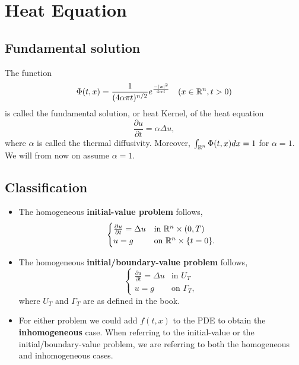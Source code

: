 \documentclass[oneside,a4paper,11pt]{report}
\begin{document}
\section{Heat Equation}

\subsection{Fundamental solution}
The function
\[ \Phi(t,x) = \frac{1}{(4\alpha \pi t)^{n/2}} e^{\frac{-|x|^2}{4\alpha t}} \quad (x \in {\mathbb{R}^n}, t > 0) \]
is called the fundamental solution, or heat Kernel, of the heat equation
\[ \frac{\partial u}{\partial t} = \alpha \Delta u, \]
where $\alpha$ is called the thermal diffusivity. Moreover, $\int_{{\mathbb{R}^n}} \Phi(t,x) dx = 1 $ for $\alpha=1$. We will from now on assume $\alpha = 1$.

\subsection{Classification}
\begin{itemize}

\item The homogeneous \textbf{initial-value problem} follows,
\[\begin{cases}
\frac{\partial u}{\partial t} = \Delta u & \text{in } {\mathbb{R}^n} \times (0,T)\\
u = g & \text{on } {\mathbb{R}^n} \times \{t=0\}.
\end{cases} \]

\item The homogeneous \textbf{initial/boundary-value problem} follows,
\[\begin{cases}
\frac{\partial u}{\partial t} = \Delta u & \text{in } U_T\\
u = g & \text{on } \Gamma_T,
\end{cases} \]
where $U_T$ and $\Gamma_T$ are as defined in the book.

\item For either problem we could add $f(t,x)$ to the PDE to obtain the \textbf{inhomogeneous} case. When referring to the initial-value or the initial/boundary-value problem, we are referring to both the homogeneous and inhomogeneous cases.
\end{itemize}

\end{document}
